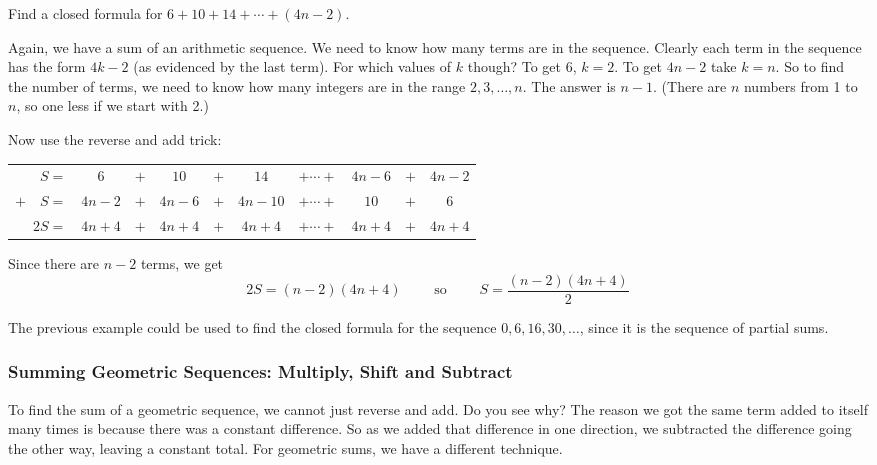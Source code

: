 \documentclass[12pt]{article}
\begin{document}
\begin{example} 
  Find a closed formula for $6 + 10 + 14 + \cdots + (4n - 2)$.
  \begin{solution}
    Again, we have a sum of an arithmetic sequence.  We need to know how many terms are in the sequence.  Clearly each term in the sequence has the form $4k -2$ (as evidenced by the last term).  For which values of $k$ though?  To get 6, $k = 2$.  To get $4n-2$ take $k = n$.  So to find the number of terms, we need to know how many integers are in the range $2,3,\ldots, n$.  The answer is $n-1$.  (There are $n$ numbers from 1 to $n$, so one less if we start with 2.)
    
    Now use the reverse and add trick:
    
        \begin{center}
    \begin{tabular}{rccccccccc}
      $S  =  $& $6 $&$ + $& $10$ & $ + $ & $14$ & $+ \cdots + $ & $4n-6$ &$ + $ & $4n-2$ \\
     $+ \quad S  = $& $4n-2$ & $+ $ & $4n-6$ & $ + $ & $4n-10$& $+ \cdots + $& $10$ & $+$ & 6 \\ \hline
     $2S  = $& $4n+4$ & $+ $ & $4n+4$ & $ + $ & $4n+4$& $+ \cdots + $&$4n+4$ & $+$ & $4n+4$ \\
    \end{tabular}
    \end{center}
    
    Since there are $n-2$ terms, we get
    \[2S = (n-2)(4n+4)\qquad \mbox{ so }\qquad S = \frac{(n-2)(4n+4)}{2}\]
  \end{solution}

\end{example}

The previous example could be used to find the closed formula for the sequence $0, 6, 16, 30, \ldots$, since it is the sequence of partial sums.


\subsubsection*{Summing Geometric Sequences: Multiply, Shift and Subtract}

To find the sum of a geometric sequence, we cannot just reverse and add.  Do you see why?  The reason we got the same term added to itself many times is because there was a constant difference.  So as we added that difference in one direction, we subtracted the difference going the other way, leaving a constant total.  For geometric sums, we have a different technique.
\end{document}

